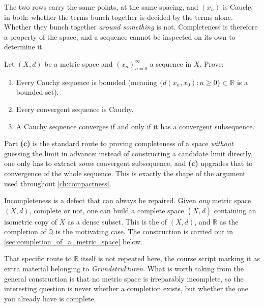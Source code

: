 The two rows carry the same points, at the same spacing, and $(x_n)$ is Cauchy in both: whether
the terms bunch together is decided by the terms alone. Whether they bunch together \emph{around
something} is not. Completeness is therefore a property of the space, and a sequence cannot be
inspected on its own to determine it.

\begin{exercise}
\label{ex:cauchy_elementary_facts}
Let $(X,d)$ be a metric space and $(x_n)_{n=0}^\infty$ a sequence in $X$. Prove:
\begin{enumerate}[label=\textbf{(\alph*)}]
  \item Every Cauchy sequence is bounded (meaning $\{d(x_n,x_0) : n\geq0\} \subset \mathbb{R}$ is
    a bounded set).
  \item Every convergent sequence is Cauchy.
  \item A Cauchy sequence converges if and only if it has a convergent subsequence.
\end{enumerate}
\end{exercise}

\begin{remark}
Part \textbf{(c)} is the standard route to proving completeness of a space \emph{without}
guessing the limit in advance: instead of constructing a candidate limit directly, one only has
to extract \emph{some} convergent subsequence, and \textbf{(c)} upgrades that to convergence of
the whole sequence. This is exactly the shape of the argument used throughout
\cref{ch:compactness}.
\end{remark}

\begin{remark}
Incompleteness is a defect that can always be repaired. Given \emph{any} metric space $(X,d)$,
complete or not, one can build a complete space $(\overline X,\overline d)$ containing an
isometric copy of $X$ as a dense subset. This is the  of $(X,d)$, and
$\mathbb{R}$ as the completion of $\mathbb{Q}$ is the motivating case. The construction is carried
out in \cref{sec:completion_of_a_metric_space} below.

That specific route to $\mathbb{R}$ itself is not repeated here, the course script marking it as
extra material belonging to \emph{Grundstrukturen}. What is worth taking from the general
construction is that no metric space is irreparably incomplete, so the interesting question is
never whether a completion exists, but whether the one you already have is complete.
\end{remark}

